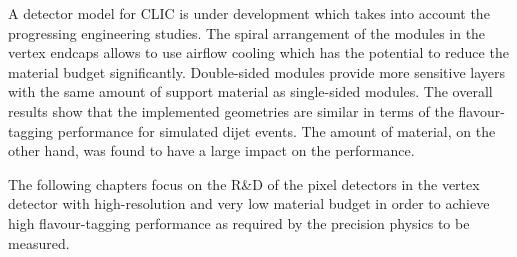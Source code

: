 A detector model for CLIC is under development which takes into
account the progressing engineering studies. The spiral arrangement of
the modules in the vertex endcaps allows to use airflow cooling which
has the potential to reduce the material budget
significantly. Double-sided modules provide more sensitive layers with
the same amount of support material as single-sided modules. The
overall results show that the implemented geometries are similar in
terms of the flavour-tagging performance for simulated dijet
events. The amount of material, on the other hand, was found to have a
large impact on the performance. 

The following chapters focus on the R\&D of the pixel detectors in the
vertex detector with high-resolution and very low material budget in
order to achieve high flavour-tagging performance as required by the
precision physics to be measured.








